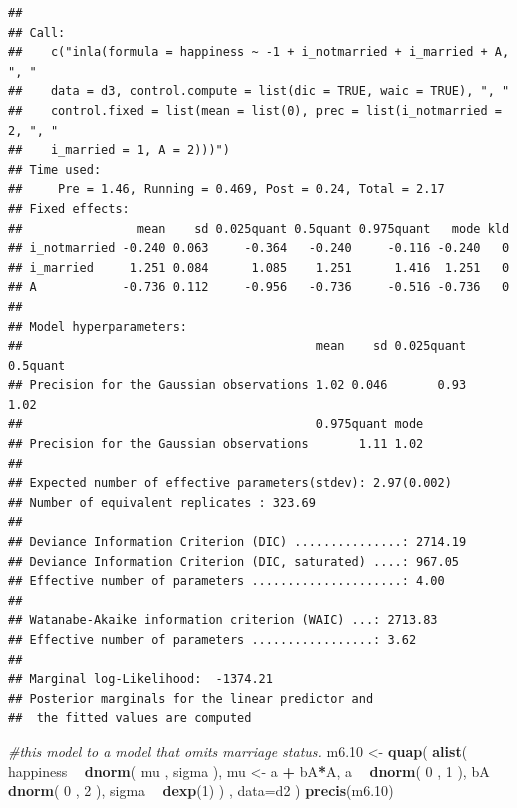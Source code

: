 \documentclass[
]{article}
\newenvironment{Shaded}{\begin{snugshade}}{\end{snugshade}}
\newcommand{\CommentTok}[1]{\textcolor[rgb]{0.56,0.35,0.01}{\textit{#1}}}
\newcommand{\DataTypeTok}[1]{\textcolor[rgb]{0.13,0.29,0.53}{#1}}
\newcommand{\DecValTok}[1]{\textcolor[rgb]{0.00,0.00,0.81}{#1}}
\newcommand{\FloatTok}[1]{\textcolor[rgb]{0.00,0.00,0.81}{#1}}
\newcommand{\KeywordTok}[1]{\textcolor[rgb]{0.13,0.29,0.53}{\textbf{#1}}}
\newcommand{\NormalTok}[1]{#1}
\newcommand{\OperatorTok}[1]{\textcolor[rgb]{0.81,0.36,0.00}{\textbf{#1}}}
\newcommand{\StringTok}[1]{\textcolor[rgb]{0.31,0.60,0.02}{#1}}
\begin{document}
\begin{verbatim}
## 
## Call:
##    c("inla(formula = happiness ~ -1 + i_notmarried + i_married + A, ", " 
##    data = d3, control.compute = list(dic = TRUE, waic = TRUE), ", " 
##    control.fixed = list(mean = list(0), prec = list(i_notmarried = 2, ", " 
##    i_married = 1, A = 2)))") 
## Time used:
##     Pre = 1.46, Running = 0.469, Post = 0.24, Total = 2.17 
## Fixed effects:
##                mean    sd 0.025quant 0.5quant 0.975quant   mode kld
## i_notmarried -0.240 0.063     -0.364   -0.240     -0.116 -0.240   0
## i_married     1.251 0.084      1.085    1.251      1.416  1.251   0
## A            -0.736 0.112     -0.956   -0.736     -0.516 -0.736   0
## 
## Model hyperparameters:
##                                         mean    sd 0.025quant 0.5quant
## Precision for the Gaussian observations 1.02 0.046       0.93     1.02
##                                         0.975quant mode
## Precision for the Gaussian observations       1.11 1.02
## 
## Expected number of effective parameters(stdev): 2.97(0.002)
## Number of equivalent replicates : 323.69 
## 
## Deviance Information Criterion (DIC) ...............: 2714.19
## Deviance Information Criterion (DIC, saturated) ....: 967.05
## Effective number of parameters .....................: 4.00
## 
## Watanabe-Akaike information criterion (WAIC) ...: 2713.83
## Effective number of parameters .................: 3.62
## 
## Marginal log-Likelihood:  -1374.21 
## Posterior marginals for the linear predictor and
##  the fitted values are computed
\end{verbatim}

\begin{Shaded}
\begin{Highlighting}[]
\CommentTok{#this model to a model that omits marriage status.}
\NormalTok{m6}\FloatTok{.10}\NormalTok{ <-}\StringTok{ }\KeywordTok{quap}\NormalTok{(}
    \KeywordTok{alist}\NormalTok{(}
\NormalTok{        happiness }\OperatorTok{~}\StringTok{ }\KeywordTok{dnorm}\NormalTok{( mu , sigma ),}
\NormalTok{        mu <-}\StringTok{ }\NormalTok{a }\OperatorTok{+}\StringTok{ }\NormalTok{bA}\OperatorTok{*}\NormalTok{A,}
\NormalTok{        a }\OperatorTok{~}\StringTok{ }\KeywordTok{dnorm}\NormalTok{( }\DecValTok{0}\NormalTok{ , }\DecValTok{1}\NormalTok{ ),}
\NormalTok{        bA }\OperatorTok{~}\StringTok{ }\KeywordTok{dnorm}\NormalTok{( }\DecValTok{0}\NormalTok{ , }\DecValTok{2}\NormalTok{ ),}
\NormalTok{        sigma }\OperatorTok{~}\StringTok{ }\KeywordTok{dexp}\NormalTok{(}\DecValTok{1}\NormalTok{)}
\NormalTok{    ) , }\DataTypeTok{data=}\NormalTok{d2 )}
\KeywordTok{precis}\NormalTok{(m6}\FloatTok{.10}\NormalTok{)}
\end{Highlighting}
\end{Shaded}
\end{document}
